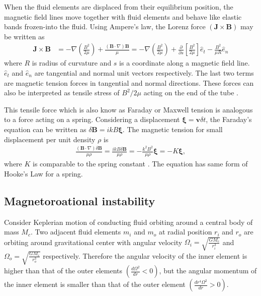 \documentclass{jfm}
\newcommand{\del}{\nabla}
\begin{document}
When the fluid elements are displaced from their equilibrium position, the 
magnetic field lines move together with fluid elements and behave like elastic
bands frozen-into the fluid. Using Ampere's law, the Lorenz force 
$(\mathbf{J}\times\mathbf{B})$ may be written as
\begin{align}
    \mathbf{J}\times\mathbf{B} &= - \del\left(\frac{B^2}{2\mu}\right) +\frac{(\mathbf{B}\cdot \del)\mathbf{B}}{\mu}
    =- \del\left(\frac{B^2}{2\mu}\right)+\frac{\partial}{\partial s} \left[\frac{B^2}{2\mu}\right]\hat{e}_t - \frac{B^2}{\mu R}\hat{e}_n
\end{align} 
where $R$ is radius of curvature and $s$ is a coordinate along a magnetic 
field line. $\hat{e}_t$ and $\hat{e}_n$ are tangential and normal unit vectors 
respectively. The last two terms are magnetic tension forces in tangential and 
normal directions. These forces can also be interpreted as tensile stress of 
$B^2/2\mu$ acting on the end of the tube \cite[see][]{Davidson2001}. 

This tensile force which is also know as Faraday or Maxwell tension is 
analogous to a force acting on a spring. Considering a displacement 
$\boldsymbol{\xi}=\mathbf{v}\delta t$, the Faraday's equation can be written 
as $\delta \mathbf{B} = ikB\boldsymbol{\xi}$. The magnetic tension for small 
displacement per unit density $\rho$ is
\begin{align}
    \frac{(\mathbf{B}\cdot\del)\delta \mathbf{B}}{\mu \rho}=\frac{ikB\delta \mathbf{B}}{\mu \rho} = -\frac{k^2 B^2}{\mu\rho} \boldsymbol{\xi} = -K \boldsymbol{\xi},
\end{align}
where $K$ is comparable to the spring constant \cite[see][]{Wiki:MRI,Balbus1998}. The 
equation has same form of Hooke's Law for a spring.


%
%
\subsection{Magnetoroational instability}
Consider Keplerian motion of conducting fluid orbiting around a central body of mass $M_c$.
Two adjacent fluid elements $m_i$ and $m_o$ at radial position $r_i$ and $r_o$ are orbiting around gravitational center with angular velocity $\Omega_i=\sqrt{\frac{GM_c}{r_i^{3}}}$ and $\Omega_o=\sqrt{\frac{GM_c}{r_o^{3}}}$ respectively. Therefore the angular velocity of the inner element is higher than that of the outer elements $\left(\frac{d \Omega^2}{dr}<0\right)$, but the angular momentum of the inner element is smaller than that of the outer element $\left(\frac{d r^4\Omega^2}{dr}>0\right)$.
\end{document}
